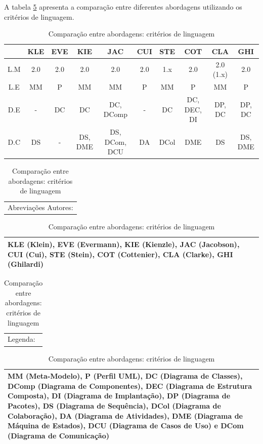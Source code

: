 A tabela \ref{tab:comparison_table_language} apresenta a comparação entre diferentes abordagens utilizando os critérios de linguagem.

\begin{landscape}
\begin{table}[h]
	\centering
	\begin{tabular}{ | c | c | c | c | c | c | c | c | c | c | }
		\hline
		 & KLE & EVE & KIE & JAC & CUI & STE & COT & CLA & GHI \\
		\hline
		 L.M & 2.0 & 2.0 & 2.0 & 2.0 & 2.0 & 1.x & 2.0 & 2.0 (1.x) & 2.0 \\
		\hline
		 L.E & MM & P & MM & MM & P & MM & P & MM & P \\
		\hline
		 D.E & - & DC & DC & DC, DComp & - & DC & DC, DEC, DI & DP, DC & DP, DC\\
		\hline
		 D.C & DS & - & DS, DME & DS, DCom, DCU & DA & DCol & DME & DS & DS, DME \\
		\hline
	\end{tabular}
	
	\hspace{2em}

	\begin{tabular}{  p{16.6cm}  }
		Abreviações Autores: \\
	\end{tabular}
	
	\begin{tabular}{ | p{16.6cm} | }
		\hline
		KLE (Klein), EVE (Evermann), KIE (Kienzle), JAC (Jacobson), CUI (Cui), STE (Stein), COT (Cottenier), CLA (Clarke), GHI (Ghilardi) \\
		\hline
	\end{tabular}
	
	\begin{tabular}{  p{16.6cm}  }
		Legenda: \\
	\end{tabular}

	\begin{tabular}{ | p{16.6cm} | }
		\hline
		MM (Meta-Modelo), P (Perfil UML), DC (Diagrama de Classes), DComp (Diagrama de Componentes), DEC (Diagrama de Estrutura Composta), DI
		(Diagrama de Implantação), DP (Diagrama de Pacotes), DS (Diagrama de Sequência), DCol (Diagrama de Colaboração), DA (Diagrama de Atividades), 
		DME (Diagrama de Máquina de Estados), DCU (Diagrama de Casos de Uso) e DCom (Diagrama de Comunicação)\\
		\hline
	\end{tabular}
	\caption{Comparação entre abordagens: critérios de linguagem}
	\label{tab:comparison_table_language}
\end{table} 
\end{landscape}

